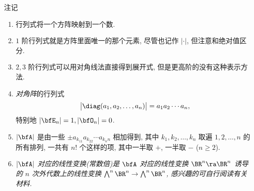 \begin{frame}{注记}
	\begin{enumerate}
		\item 行列式将一个方阵映射到一个数.
		\item $1$ 阶行列式就是方阵里面唯一的那个元素, 尽管也记作 $|\cdot|$, 但注意和绝对值区分.
		\item $2,3$ 阶行列式可以用对角线法直接得到展开式, 但是更高阶的没有这种表示方法.
		\item \emph{对角阵}的行列式
		\[\bigl|\diag(a_1,a_2,\dots,a_n)\bigr|=a_1a_2\cdots a_n,\]
		特别地 $|\bfE_n|=1,|\bfO_n|=0$.
		\item $|\bfA|$ 是由一些 $\pm a_{k_11}a_{k_22}\cdots a_{k_nn}$ 相加得到, 其中 $k_1,k_2,\dots,k_n$ 取遍 $1,2,\dots,n$ 的所有排列, 一共有 $n!$ 个这样的项, 其中一半取 $+$, 一半取 $-$ ($n\ge2$).
		\item {\itshape $|\bfA|$ 对应的线性变换(常数倍)是 $\bfA$ 对应的线性变换 $\BR^n\ra\BR^n$ 诱导的 $n$ 次外代数上的线性变换 $\bigwedge^n\BR^n\to\bigwedge^n\BR^n$, 感兴趣的可自行阅读有关材料.}
	\end{enumerate}
\end{frame}




